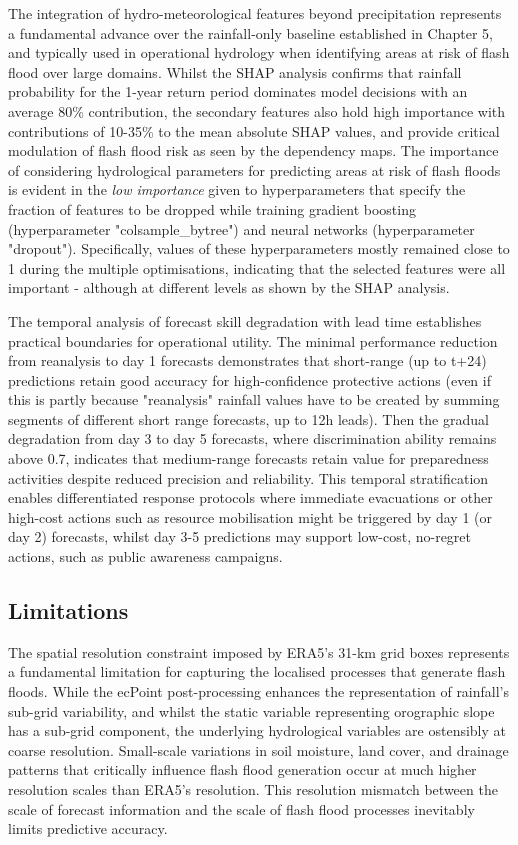 The integration of hydro-meteorological features beyond precipitation represents a fundamental advance over the rainfall-only baseline established in Chapter 5, and typically used in operational hydrology when identifying areas at risk of flash flood over large domains. Whilst the SHAP analysis confirms that rainfall probability for the 1-year return period dominates model decisions with an average 80\% contribution, the secondary features also hold high importance with contributions of 10-35\% to the mean absolute SHAP values, and provide critical modulation of flash flood risk as seen by the dependency maps. The importance of considering hydrological parameters for predicting areas at risk of flash floods is evident in the \textit{low importance} given to hyperparameters that specify the fraction of features to be dropped while training gradient boosting (hyperparameter "colsample\_bytree") and neural networks (hyperparameter "dropout"). Specifically, values of these hyperparameters mostly remained close to 1 during the multiple optimisations, indicating that the selected features were all important - although at different levels as shown by the SHAP analysis. 

The temporal analysis of forecast skill degradation with lead time establishes practical boundaries for operational utility. The minimal performance reduction from reanalysis to day 1 forecasts demonstrates that short-range (up to t+24) predictions retain good accuracy for high-confidence protective actions (even if this is partly because "reanalysis" rainfall values have to be created by summing segments of different short range forecasts, up to 12h leads). Then the gradual degradation from day 3 to day 5 forecasts, where discrimination ability remains above 0.7, indicates that medium-range forecasts retain value for preparedness activities despite reduced precision and reliability. This temporal stratification enables differentiated response protocols where immediate evacuations or other high-cost actions such as resource mobilisation might be triggered by day 1 (or day 2) forecasts, whilst day 3-5 predictions may support low-cost, no-regret actions, such as public awareness campaigns.
 

\subsection{Limitations}

The spatial resolution constraint imposed by ERA5's 31-km grid boxes represents a fundamental limitation for capturing the localised processes that generate flash floods. While the ecPoint post-processing enhances the representation of rainfall's sub-grid variability, and whilst the static variable representing orographic slope has a sub-grid component, the underlying hydrological variables are ostensibly at coarse resolution. Small-scale variations in soil moisture, land cover, and drainage patterns that critically influence flash flood generation occur at much higher resolution scales than ERA5's resolution. This resolution mismatch between the scale of forecast information and the scale of flash flood processes inevitably limits predictive accuracy.

